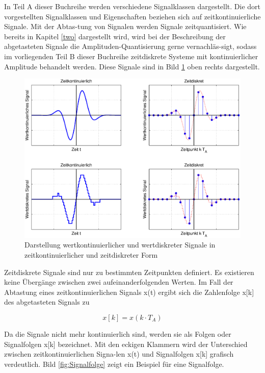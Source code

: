 \noindent In Teil A dieser Buchreihe werden verschiedene Signalklassen dargestellt. Die dort vorgestellten Signalklassen und Eigenschaften beziehen sich auf zeitkontinuierliche Signale. Mit der Abtas-tung von Signalen werden Signale zeitquantisiert. Wie bereits in Kapitel \ref{two} dargestellt wird, wird bei der Beschreibung der abgetasteten Signale die Amplituden-Quantisierung gerne vernachläs-sigt, sodass im vorliegenden Teil B dieser Buchreihe zeitdiskrete Systeme mit kontinuierlicher Amplitude behandelt werden. Diese Signale sind in Bild \ref{fig:DiskreKontinuerlich} oben rechts dargestellt.
\clearpage
\begin{figure}[H]
  \includegraphics[width=1.0\textwidth]{Kapitel3/Bilder/image1.eps}
  \caption{Darstellung wertkontinuierlicher und wertdiskreter Signale in zeitkontinuierlicher und zeitdiskreter Form}
  \label{fig:DiskreKontinuerlich}
\end{figure}

\noindent Zeitdiskrete Signale sind nur zu bestimmten Zeitpunkten definiert. Es existieren keine Übergänge zwischen zwei aufeinanderfolgenden Werten. Im Fall der Abtastung eines zeitkontinuierlichen Signals x(t) ergibt sich die Zahlenfolge x[k] des abgetasteten Signals zu

\begin{equation}\label{eq:threeone}
x\left[k\right]=x\left(k\cdot T_{A} \right)
\end{equation}

\noindent Da die Signale nicht mehr kontinuierlich sind, werden sie als Folgen oder Signalfolgen x[k] bezeichnet. Mit den eckigen Klammern wird der Unterschied zwischen zeitkontinuierlichen Signa-len x(t) und Signalfolgen x[k] grafisch verdeutlich. Bild \ref{fig:Signalfolge} zeigt ein Beispiel für eine Signalfolge.

